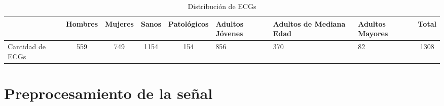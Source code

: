 \documentclass[12pt,letterpaper,oneside,openright]{book}
\begin{document}
\begin{table}[t]
	\begin{center}
		\begin{tabular}{p{1.7cm}|c|c|c|c|p{1.7cm}|p{2cm}|p{1.7cm}|c}
			
			& Hombres & Mujeres & Sanos & Patológicos & Adultos Jóvenes & Adultos de Mediana Edad & Adultos Mayores & Total \\
			\hline
			Cantidad de ECGs & 559 & 749 & 1154 & 154 & 856 & 370 & 82 & 1308 \\
			
		\end{tabular}
		\caption{Distribución de ECGs}
		\label{tab:distriECGs}
	\end{center}
\end{table}


\section{Preprocesamiento de la señal}
	
\end{document}
